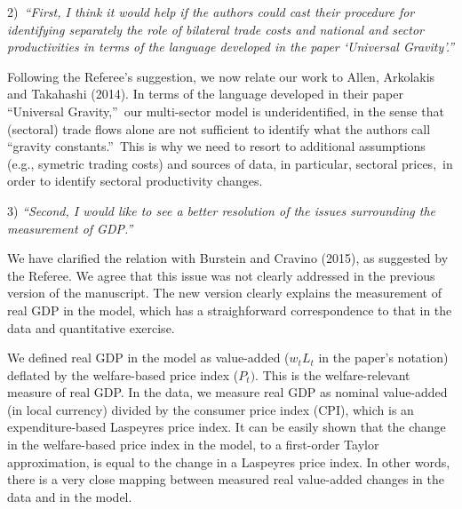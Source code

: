 \documentclass[12pt]{article}
\begin{document}
2)\textit{\ \textquotedblleft First, I think it would help if the authors
could cast their procedure for identifying separately the role of bilateral
trade costs and national and sector productivities in terms of the language
developed in the paper `Universal Gravity'.\textquotedblright }

Following the Referee's suggestion, we now relate our work to Allen,
Arkolakis and Takahashi (2014). In terms of the language developed in their
paper \textquotedblleft Universal Gravity,\textquotedblright\ our
multi-sector model is underidentified, in the sense that (sectoral) trade
flows alone are not sufficient to identify what the authors call
\textquotedblleft gravity constants.\textquotedblright\ This is why we need
to resort to additional assumptions (e.g., symetric trading costs) and
sources of data, in particular, sectoral prices,\ in order to identify
sectoral productivity changes. \bigskip

3) \textit{\textquotedblleft Second, I would like to see a better resolution
of the issues surrounding the measurement of GDP.\textquotedblright }

We have clarified the relation with Burstein and Cravino (2015), as
suggested by the Referee. We agree that this issue was not clearly addressed
in the previous version of the manuscript. The new version clearly explains
the measurement of real GDP in the model, which has a straighforward
correspondence to that in the data and quantitative exercise.

We defined real GDP in the model as value-added ($w_{t}L_{t}$ in the paper's
notation) deflated by the welfare-based price index ($P_{t})$. This is the
welfare-relevant measure of real GDP. In the data, we measure real GDP as
nominal value-added (in local currency) divided by the consumer price index
(CPI), which is an expenditure-based Laspeyres price index. It can be easily
shown that the change in the welfare-based price index in the model, to a
first-order Taylor approximation, is equal to the change in a Laspeyres
price index. In other words, there is a very close mapping between measured
real value-added changes in the data and in the model.
\end{document}
